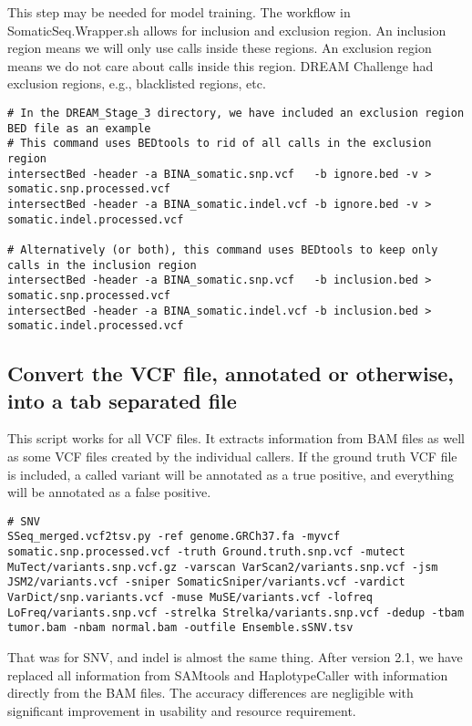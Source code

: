 \documentclass[10pt,letterpaper]{article}
\begin{document}
\begin{sloppypar}
This step may be needed for model training. The workflow in SomaticSeq.Wrapper.sh allows for inclusion and exclusion region. An inclusion region means we will only use calls inside these regions. An exclusion region means we do not care about calls inside this region. DREAM Challenge had exclusion regions, e.g., blacklisted regions, etc. 
	
\begin{lstlisting}
# In the DREAM_Stage_3 directory, we have included an exclusion region BED file as an example
# This command uses BEDtools to rid of all calls in the exclusion region
intersectBed -header -a BINA_somatic.snp.vcf   -b ignore.bed -v > somatic.snp.processed.vcf
intersectBed -header -a BINA_somatic.indel.vcf -b ignore.bed -v > somatic.indel.processed.vcf

# Alternatively (or both), this command uses BEDtools to keep only calls in the inclusion region
intersectBed -header -a BINA_somatic.snp.vcf   -b inclusion.bed > somatic.snp.processed.vcf
intersectBed -header -a BINA_somatic.indel.vcf -b inclusion.bed > somatic.indel.processed.vcf

\end{lstlisting}



\subsection{Convert the VCF file, annotated or otherwise, into a tab separated file}
This script works for all VCF files. It extracts information from BAM files as well as some VCF files created by the individual callers. If the ground truth VCF file is included, a called variant will be annotated as a true positive, and everything will be annotated as a false positive.

	
\begin{lstlisting}
# SNV
SSeq_merged.vcf2tsv.py -ref genome.GRCh37.fa -myvcf somatic.snp.processed.vcf -truth Ground.truth.snp.vcf -mutect MuTect/variants.snp.vcf.gz -varscan VarScan2/variants.snp.vcf -jsm JSM2/variants.vcf -sniper SomaticSniper/variants.vcf -vardict VarDict/snp.variants.vcf -muse MuSE/variants.vcf -lofreq LoFreq/variants.snp.vcf -strelka Strelka/variants.snp.vcf -dedup -tbam tumor.bam -nbam normal.bam -outfile Ensemble.sSNV.tsv
\end{lstlisting}


That was for SNV, and indel is almost the same thing. After version 2.1, we have replaced all information from SAMtools and HaplotypeCaller with information directly from the BAM files. The accuracy differences are negligible with significant improvement in usability and resource requirement.


\end{sloppypar}
\end{document}
